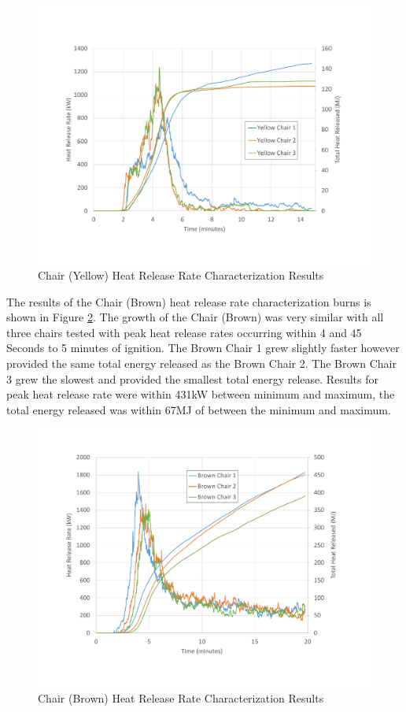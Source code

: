 \documentclass{article}
\begin{document}
\begin{figure}[H]
	\centering
	\includegraphics[width=\textwidth]{0_Images/Furniture/ChairYellow_HRR.pdf}
	\caption{Chair (Yellow) Heat Release Rate Characterization Results}
	\label{fig:YellowChairHRR}
\end{figure}

The results of the Chair (Brown) heat release rate characterization burns is shown in Figure \ref{fig:BrownChairHRR}. The growth of the Chair (Brown) was very similar with all three chairs tested with peak heat release rates occurring within 4 and 45 Seconds to 5 minutes of ignition. The Brown Chair 1 grew slightly faster however provided the same total energy released as the Brown Chair 2. The Brown Chair 3 grew the slowest and provided the smallest total energy release. Results for peak heat release rate were within 431kW between minimum and maximum, the total energy released was within 67MJ of between the minimum and maximum. 

\begin{figure}[H]
	\centering
	\includegraphics[height=0.45\textheight]{0_Images/Furniture/BrownChair_HRR.pdf}
	\caption{Chair (Brown) Heat Release Rate Characterization Results}
	\label{fig:BrownChairHRR}
\end{figure}
\end{document}
